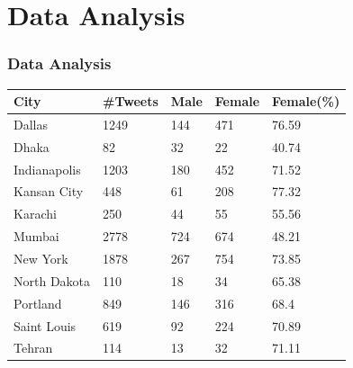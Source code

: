 \documentclass{beamer}
\begin{document}
  \section{Data Analysis}
     \begin{frame}
     \frametitle{Data Analysis}
     \centering
     \begin{tabular}{|l|l|l|l|l|}
     	\hline
     	\rowcolor{LightCyan}
     	\textbf{City} & \textbf{\#Tweets} & \textbf{Male} & \textbf{Female} & \textbf{Female(\%)}   \\
     	
     	\hline
     	Dallas & 1249 & 144 & 471 & 76.59 \\
     	\hline
     	Dhaka & 82 & 32 &  22 & \colorbox{yellow!50}{40.74}  \\
     	\hline
     	Indianapolis & 1203 & 180 & 452 & 71.52  \\
     	\hline
     	Kansan City & 448 & 61 & 208 & 77.32  \\
     	\hline
     	Karachi & 250 & 44 & 55 & \colorbox{yellow!60}{55.56}  \\
     	\hline
     	Mumbai & 2778 & 724 & 674 & \colorbox{yellow!50}{48.21}  \\
     	\hline
     	New York & 1878 & 267 & 754 & 73.85  \\
     	\hline
     	North Dakota & 110 & 18 & 34 & 65.38  \\
     	\hline
     	Portland & 849 & 146 & 316 & 68.4  \\
     	\hline
     	Saint Louis & 619 & 92 & 224 & 70.89  \\
     	\hline
     	Tehran & 114 & 13 & 32 & 71.11  \\
     	\hline
     	
     	
     \end{tabular}
     
 \end{frame}
\end{document}

